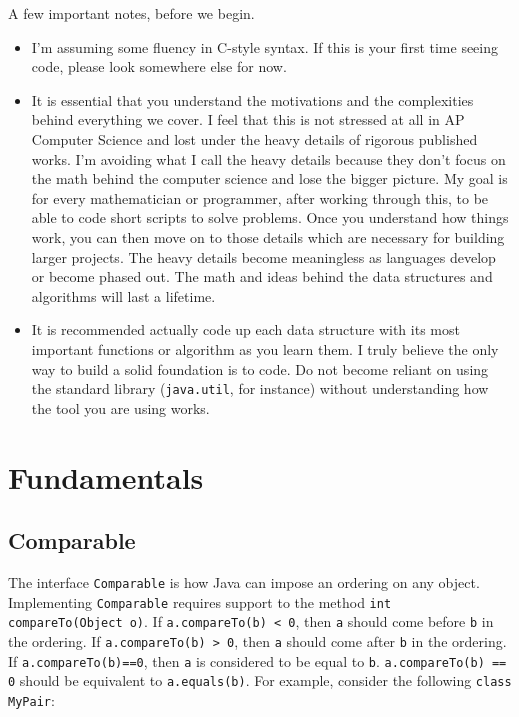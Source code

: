 \documentclass[11pt]{book}
\begin{document}
A few important notes, before we begin.

\begin{itemize}

\item

I'm assuming some fluency in C-style syntax. If this is your first time seeing code, please look somewhere else for now.

\item

It is essential that you understand the motivations and the complexities behind everything we cover. I feel that this is not stressed at all in AP Computer Science and lost under the heavy details of rigorous published works. I'm avoiding what I call the heavy details because they don't focus on the math behind the computer science and lose the bigger picture. My goal is for every mathematician or programmer, after working through this, to be able to code short scripts to solve problems. Once you understand how things work, you can then move on to those details which are necessary for building larger projects. The heavy details become meaningless as languages develop or become phased out. The math and ideas behind the data structures and algorithms will last a lifetime.

\item

It is recommended actually code up each data structure with its most important functions or algorithm as you learn them. I truly believe the only way to build a solid foundation is to code. Do not become reliant on using the standard library (\texttt{java.util}, for instance) without understanding how the tool you are using works.

\end{itemize}

\chapter{Fundamentals}

\section{Comparable}

The interface \texttt{Comparable} is how Java can impose an ordering on any object. Implementing \texttt{Comparable} requires support to the method \texttt{int compareTo(Object o)}. If \texttt{a.compareTo(b) < 0}, then \texttt{a} should come before \texttt{b} in the ordering. If \texttt{a.compareTo(b) > 0}, then \texttt{a} should come after \texttt{b} in the ordering. If \texttt{a.compareTo(b)==0}, then \texttt{a} is considered to be equal to \texttt{b}. \texttt{a.compareTo(b) == 0} should be equivalent to \texttt{a.equals(b)}. For example, consider the following \texttt{class MyPair}:
\end{document}
